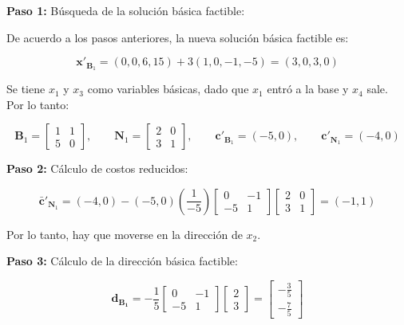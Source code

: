 \begin{enumerate}
\textbf{Paso 1:} Búsqueda de la solución básica factible:

    De acuerdo a los pasos anteriores, la nueva solución básica factible es:

    \begin{equation}
        \mathbf{x}'_{\mathbf{B}_1}
        =
        (0,0,6,15)
        +
        3(1,0,-1,-5)
        =
        (3,0,3,0)
    \end{equation}

    Se tiene $x_1$ y $x_3$ como variables básicas, dado que $x_1$ entró a la base y $x_4$ sale. Por lo tanto:

    \begin{equation}
        \mathbf{B}_1
        =
        \begin{bmatrix}
            1 & 1 \\
            5 & 0
        \end{bmatrix},
        \qquad
        \mathbf{N}_1
        =
        \begin{bmatrix}
            2 & 0 \\
            3 & 1
        \end{bmatrix},
        \qquad
        \mathbf{c}'_{\mathbf{B}_1} = (-5,0),
        \qquad
        \mathbf{c}'_{\mathbf{N}_1} = (-4,0)
    \end{equation}

 \textbf{Paso 2:} Cálculo de costos reducidos:

    \begin{equation}
        \bar{\mathbf{c}}'_{\mathbf{N}_1}
        =
        (-4,0)
        -
        (-5,0)
        \left(
        \frac{1}{-5}
        \right)
        \begin{bmatrix}
            0 & -1 \\
            -5 & 1
        \end{bmatrix}
        \begin{bmatrix}
            2 & 0 \\
            3 & 1
        \end{bmatrix}
        =
        (-1,1)
    \end{equation}

    Por lo tanto, hay que moverse en la dirección de $x_2$.

\textbf{Paso 3:} Cálculo de la dirección básica factible:

    \begin{equation}
        \mathbf{d}_\mathbf{B_1}
        =
        -
        \frac{1}{5}
        \begin{bmatrix}
            0 & -1 \\
            -5 & 1
        \end{bmatrix}
        \begin{bmatrix}
            2 \\
            3
        \end{bmatrix}
        =
        \begin{bmatrix}
            -\frac{3}{5} \\
            -\frac{7}{5}
        \end{bmatrix}
    \end{equation}


\end{enumerate}
